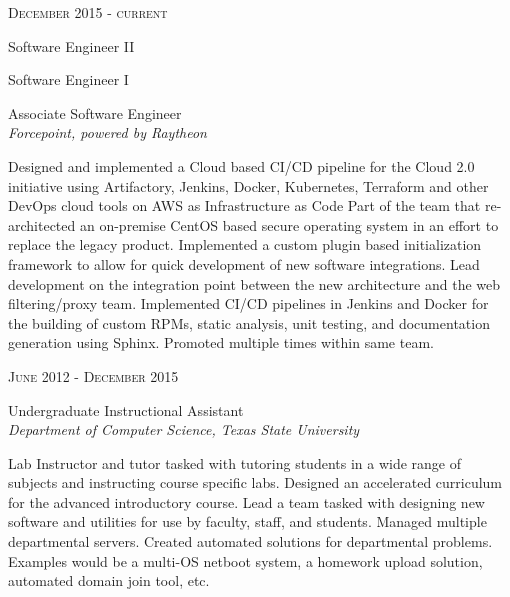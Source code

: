 \documentclass[10pt]{article} %
\begin{document}
\begin{minipage}[t]{0.5\textwidth}
{\raggedleft\textsc{December 2015 - current}\par}

{
\raggedright\large Software Engineer II\\
\raggedright\small Software Engineer I\\
\raggedright\small Associate Software Engineer\\
\textit{Forcepoint, powered by Raytheon}\\[5pt]}

\normalsize{Designed and implemented a Cloud based CI/CD pipeline for the Cloud 2.0 initiative using Artifactory, Jenkins, Docker, Kubernetes, Terraform and other DevOps cloud tools on AWS as Infrastructure as Code Part of the team that re-architected an on-premise CentOS based secure operating system in an effort to replace the legacy product. Implemented a custom plugin based initialization framework to allow for quick development of new software integrations. Lead development on the integration point between the new architecture and the web filtering/proxy team. Implemented CI/CD pipelines in Jenkins and Docker for the building of custom RPMs, static analysis, unit testing, and documentation generation using Sphinx. Promoted multiple times within same team.}\\



{\raggedleft\textsc{June 2012 - December 2015}\par}

{\raggedright\large Undergraduate Instructional Assistant\\
\textit{Department of Computer Science, Texas State University}\\[5pt]}

\normalsize{Lab Instructor and tutor tasked with tutoring students in a wide range of subjects and instructing course specific labs. Designed an accelerated curriculum for the advanced introductory course. Lead a team tasked with designing new software and utilities for use by faculty, staff, and students. Managed multiple departmental servers. Created automated solutions for departmental problems. Examples would be a multi-OS netboot system, a homework upload solution, automated domain join tool, etc.}\\


\end{minipage}
\end{document}
